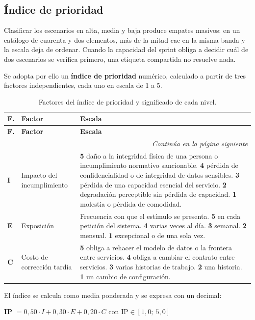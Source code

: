 \documentclass[11pt,a4paper]{article}
\newcommand{\contlinea}[1]{\multicolumn{#1}{r}{\footnotesize\itshape Continúa en la página siguiente}}
\begin{document}
\subsection{Índice de prioridad}
\label{sec:indice}

Clasificar los escenarios en alta, media y baja produce empates masivos: en un catálogo de cuarenta y dos elementos, más de la mitad cae en la misma banda y la escala deja de ordenar. Cuando la capacidad del sprint obliga a decidir cuál de dos escenarios se verifica primero, una etiqueta compartida no resuelve nada.

Se adopta por ello un \textbf{índice de prioridad} numérico, calculado a partir de tres factores independientes, cada uno en escala de 1 a 5.

\begin{longtable}{L{1.0cm} L{3.2cm} L{10.4cm}}
\caption{Factores del índice de prioridad y significado de cada nivel.}\label{tab:factores}\\
\toprule
\textbf{F.} & \textbf{Factor} & \textbf{Escala} \\
\midrule
\endfirsthead
\toprule
\textbf{F.} & \textbf{Factor} & \textbf{Escala} \\
\midrule
\endhead
\midrule
\contlinea{3} \\
\endfoot
\bottomrule
\endlastfoot
\textbf{I} & Impacto del incumplimiento & \textbf{5} daño a la integridad física de una persona o incumplimiento normativo sancionable. \textbf{4} pérdida de confidencialidad o de integridad de datos sensibles. \textbf{3} pérdida de una capacidad esencial del servicio. \textbf{2} degradación perceptible sin pérdida de capacidad. \textbf{1} molestia o pérdida de comodidad. \\
\textbf{E} & Exposición & Frecuencia con que el estímulo se presenta. \textbf{5} en cada petición del sistema. \textbf{4} varias veces al día. \textbf{3} semanal. \textbf{2} mensual. \textbf{1} excepcional o de una sola vez. \\
\textbf{C} & Costo de corrección tardía & \textbf{5} obliga a rehacer el modelo de datos o la frontera entre servicios. \textbf{4} obliga a cambiar el contrato entre servicios. \textbf{3} varias historias de trabajo. \textbf{2} una historia. \textbf{1} un cambio de configuración. \\
\end{longtable}

\noindent El índice se calcula como media ponderada y se expresa con un decimal:

\begin{center}
\textbf{IP} $= 0{,}50 \cdot I + 0{,}30 \cdot E + 0{,}20 \cdot C$ \qquad con $\text{IP} \in [1{,}0;\ 5{,}0]$
\end{center}
\end{document}
